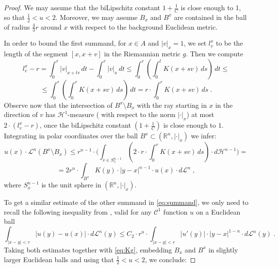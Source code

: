 \documentclass[12pt,leqno,intlimits]{amsart}
\numberwithin{equation}{section}
\theoremstyle{definition}
\theoremstyle{remark}
\newcommand{\vol}{\mathrm{vol}}
\newcommand{\R}{\mathbb{R}}
\def\eps{\varepsilon}
\begin{document}
\begin{proof}
We may assume that the biLipschitz constant $1+\frac 1 C$ is close enough to 1,  so that $\frac 1 2 < u <2$. Moreover, we may assume $B_x$ and $B^x$ are contained in the ball of radius $\frac 4 3 r$ around $x$ with respect to the background Euclidean metric.


In order to bound the first summand,  for $x\in A$ and $|v|_x=1$,  we set $l^x_v$ to be the length of the segment $[x,x+v]$
in the Riemannian metric $g$.  Then we compute
$$l_v ^x -r= \int _0 ^r |v|_{x+tv} \, dt - \int _0 ^r |v|_x \, dt   \leq \int _0 ^r (\int _0 ^t  K(x+sv) \, ds)\, dt \leq $$
$$\leq \int _0 ^r (\int _0 ^r   K(x+sv) \, ds)\, dt = r\cdot \int _0 ^r   K(x+sv) \, ds  \; .$$
Observe now that the intersection of $B^x\setminus B_x$ with the ray starting in $x$ in the direction of $v$ has $\mathcal H^1$-measure
( with respect to the norm $|\cdot |_x$)
at most $2\cdot (l_v^x -r)$, once the biLipschitz constant $(1+\frac 1 C)$ is close enough to $1$.
Integrating in polar coordinates over the  ball $B^x\subset (\R^n, |\cdot|_x)$ we infer:
$$u(x)\cdot \mathcal L^n (B^x\setminus B_x) \leq r^{n-1} \cdot \Big (\int _{v\in S^{n-1} _x} ( 2\cdot r \cdot \int _0 ^r   K(x+sv) \, ds)
\cdot d\mathcal H^{n-1} \Big ) =$$
$$=2r^n \cdot \int _{B^x}  K(y) \cdot |y-x|^{n-1} \cdot u(x) \cdot d\mathcal L^n  \;,$$
where $S^{n-1} _x$ is the unit sphere in $(\R^n, |\cdot|_x)$.








To get a  similar estimate of the other summand in  \eqref{eq:summand},
we only need to  recall  the following inequality from \cite[Lemma 4.1]{Evans}, valid for any $\mathcal C^1$ function $u$ on a Euclidean ball
\[
 \int _{|x-y| < r} |u(y)-u(x)| \cdot d\mathcal L^n (y) \leq  C_2\cdot r^{n}\cdot  \int _{|x-y| < r}|u'(y)| \cdot |y-x| ^{1-n} \cdot d\mathcal L^n (y) \; .
 \]
Taking both estimates together with \eqref{eq:Kg},  embedding $B_x$ and $B^x$ in slightly larger Euclidean balls  and using  that $\frac 1 2 < u <2$, we conclude:


\end{proof}
\end{document}
